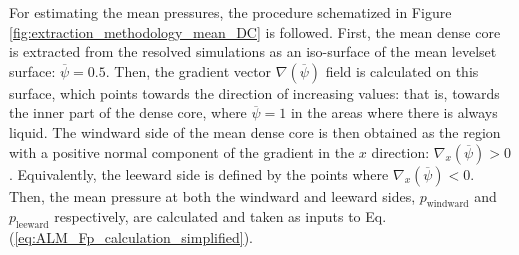 For estimating the mean pressures, the procedure schematized in Figure \ref{fig:extraction_methodology_mean_DC} is followed. First, the mean dense core is extracted from the resolved simulations as an iso-surface of the mean levelset surface: $\overline{\psi} = 0.5$. Then, the gradient vector $\nabla \left( \overline{\psi} \right)$ field is calculated on this surface, which points towards the direction of increasing values: that is, towards the inner part of the dense core, where $\overline{\psi} = 1$ in the areas where there is always liquid. The windward side of the mean dense core is then obtained as the region with a positive normal component of the gradient in the $x$ direction: $\nabla_x \left( \overline{\psi} \right) > 0$. Equivalently, the leeward side is defined by the points where $\nabla_x \left( \overline{\psi} \right) < 0$. Then, the mean pressure at both the windward and leeward sides, $p_\mathrm{windward}$ and $p_\mathrm{leeward}$ respectively, are calculated and taken as inputs to Eq. (\ref{eq:ALM_Fp_calculation_simplified}).

 








